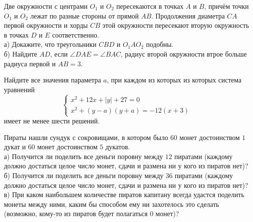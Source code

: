 \begin{training}[1]
\begin{listofex}[resume]
		\item Две окружности с центрами \( O_1 \) и \( O_2 \) пересекаются в точках \( A \) и \( B \), причём точки \( O_1 \) и \( O_2 \) лежат по разные стороны от прямой \( AB \). Продолжения диаметра \( CA \) первой окружности и хорды \( CB \) этой окружности пересекают вторую окружность в точках \( D \) и \( E \) соответственно. \\
		а) Докажите, что треугольники \( CBD \) и \( O_1AO_2 \) подобны.\\
		б) Найдите \( AD \), если \( \angle DAE=\angle BAC \), радиус второй окружности втрое больше радиуса первой и \( AB=3 \).
		\item Найдите все значения параметра \( a \), при каждом из которых из которых система уравнений
		\[\begin{cases} x^2+12x+|y|+27=0 \\ x^2+(y-a)(y+a)=-12(x+3) \end{cases}\]
		имеет не менее шести решений.
		\item Пираты нашли сундук с сокровищами, в котором было \( 60 \) монет достоинством \( 1 \) дукат и \( 60  \) монет достоинством \( 5 \) дукатов.\\
		а) Получится ли поделить все деньги поровну между \( 12 \) пиратами (каждому должно достаться целое число монет, сдачи и размена ни у кого из пиратов нет)?\\
		б) Получится ли поделить все деньги поровну между \( 36 \) пиратами (каждому должно достаться целое число монет, сдачи и размена ни у кого из пиратов нет)?\\
		в) При каком наибольшем количестве пиратов капитану всегда удастся поделить монеты между ними, каким бы способом ему ни захотелось это сделать (возможно, кому-то из пиратов будет полагаться 0 монет)?
	\end{listofex}
\end{training}

